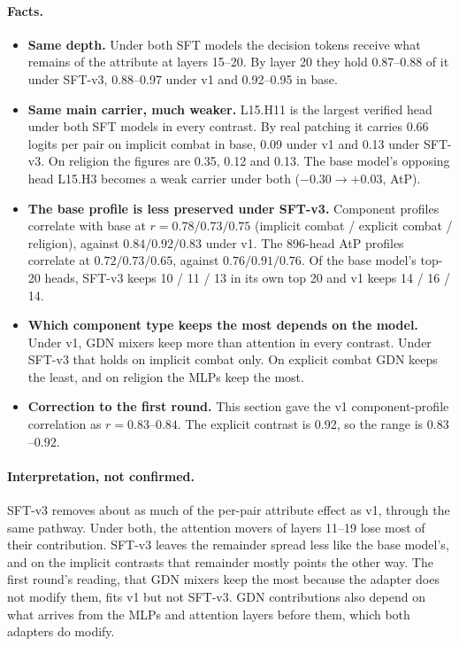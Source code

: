 \documentclass[11pt,a4paper]{article}
\newcommand{\head}[2]{\textsf{L#1.H#2}}
\begin{document}
\paragraph{Facts.}
\begin{itemize}
  \item \textbf{Same depth.} Under both SFT models the decision tokens receive what remains of the
        attribute at layers 15--20. By layer 20 they hold 0.87--0.88 of it under SFT-v3,
        0.88--0.97 under v1 and 0.92--0.95 in base.
  \item \textbf{Same main carrier, much weaker.} \head{15}{11} is the largest verified head under
        both SFT models in every contrast. By real patching it carries 0.66 logits per pair on
        implicit combat in base, 0.09 under v1 and 0.13 under SFT-v3. On religion the figures
        are 0.35, 0.12 and 0.13. The base model's opposing head \head{15}{3} becomes a weak carrier
        under both ($-0.30 \to +0.03$, AtP).
  \item \textbf{The base profile is less preserved under SFT-v3.} Component profiles correlate with
        base at $r = 0.78 / 0.73 / 0.75$ (implicit combat / explicit combat / religion), against
        $0.84 / 0.92 / 0.83$ under v1. The 896-head AtP profiles correlate at $0.72 / 0.73 / 0.65$,
        against $0.76 / 0.91 / 0.76$. Of the base model's top-20 heads, SFT-v3 keeps 10 / 11 / 13
        in its own top 20 and v1 keeps 14 / 16 / 14.
  \item \textbf{Which component type keeps the most depends on the model.} Under v1, GDN mixers keep
        more than attention in every contrast. Under SFT-v3 that holds on implicit combat only.
        On explicit combat GDN keeps the least, and on religion the MLPs keep the most.
  \item \textbf{Correction to the first round.} This section gave the v1 component-profile
        correlation as $r=0.83$--$0.84$. The explicit contrast is 0.92, so the range is $0.83$--$0.92$.
\end{itemize}

\paragraph{Interpretation, not confirmed.} SFT-v3 removes about as much of the per-pair attribute
effect as v1, through the same pathway. Under both, the attention movers of layers 11--19 lose
most of their contribution. SFT-v3 leaves the remainder spread less like the base model's, and on
the implicit contrasts that remainder mostly points the other way. The first round's reading, that
GDN mixers keep the most because the adapter does not modify them, fits v1 but not SFT-v3. GDN
contributions also depend on what arrives from the MLPs and attention layers before them, which
both adapters do modify.
\end{document}
